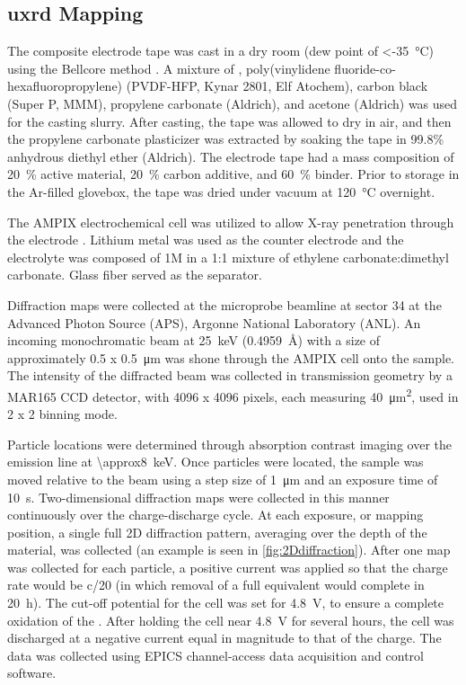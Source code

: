 \documentclass{article}
\begin{document}
\subsection{\gls{uxrd} Mapping}

The \nca{} composite electrode tape was cast in a dry room (dew point
of \SI{<-35}{\celsius}) using the Bellcore method \cite{warren1996}. A
mixture of \nca{}, poly(vinylidene fluoride-co-hexafluoropropylene)
(PVDF-HFP, Kynar 2801, Elf Atochem), carbon black (Super P, MMM),
propylene carbonate (Aldrich), and acetone (Aldrich) was used for the
casting slurry. After casting, the tape was allowed to dry in air, and
then the propylene carbonate plasticizer was extracted by soaking the
tape in 99.8\% anhydrous diethyl ether (Aldrich). The electrode tape
had a mass composition of \SI{20}{\percent} active material,
\SI{20}{\percent} carbon additive, and \SI{60}{\percent} binder. Prior
to storage in the Ar-filled glovebox, the tape was dried under vacuum
at \SI{120}{\celsius} overnight.

The AMPIX electrochemical cell was utilized to allow X-ray penetration
through the electrode \cite{borkiewicz2012}. Lithium metal was used as
the counter electrode and the electrolyte was composed of 1M
 in a 1:1 mixture of ethylene carbonate:dimethyl
carbonate. Glass fiber served as the separator.

Diffraction maps were collected at the microprobe beamline at sector
34 at the Advanced Photon Source (APS), Argonne National Laboratory
(ANL). An incoming monochromatic beam at \SI{25}{\kilo\electronvolt}
(\SI{0.4959}{\angstrom}) with a size of approximately \num{0.5} x
\SI{0.5}{\micro\meter} was shone through the AMPIX cell onto the
sample. The intensity of the diffracted beam was collected in
transmission geometry by a MAR165 CCD detector, with 4096 x 4096
pixels, each measuring \SI{40}{\square\micro\meter}, used in 2 x 2
binning mode.

Particle locations were determined through absorption contrast imaging
over the  emission line at
\SI{\approx8}{\kilo\electronvolt}. Once particles were located, the
sample was moved relative to the beam using a step size of
\SI{1}{\micro\meter} and an exposure time of
\SI{10}{\second}. Two-dimensional diffraction maps were collected in
this manner continuously over the charge-discharge cycle. At each
exposure, or mapping position, a single full 2D diffraction pattern,
averaging over the depth of the material, was collected (an example is
seen in \ref{fig:2Ddiffraction}). After one map was collected for each
particle, a positive current was applied so that the charge rate would
be c/20 (in which removal of a full  equivalent would complete
in \SI{20}{\hour}). The cut-off potential for the cell was set for
\SI{4.8}{\volt}, to ensure a complete oxidation of the \nca{}. After
holding the cell near \SI{4.8}{\volt} for several hours, the cell was
discharged at a negative current equal in magnitude to that of the
charge. The data was collected using EPICS channel-access data
acquisition and control software.
\end{document}
